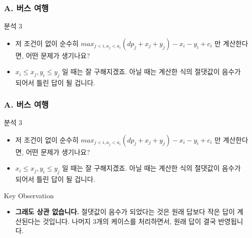 \documentclass{beamer}
\begin{document}
\begin{frame}
	\frametitle{A. 버스 여행}
	\begin{block}{분석 3}
		\begin{itemize}
			\item 저 조건이 없이 순수히 $max_{j < i, a_j < a_i} (dp_j + x_j + y_j) - x_i - y_i + c_i$ 만 계산한다면, 어떤 문제가 생기나요?
			\item $x_i \leq x_j, y_i \leq y_j$ 일 때는 잘 구해지겠죠. 아닐 때는 계산한 식의 절댓값이 음수가 되어서 틀린 답이 될 겁니다.
		\end{itemize}
	\end{block}
\end{frame}

\begin{frame}
	\frametitle{A. 버스 여행}
	\begin{block}{분석 3}
		\begin{itemize}
			\item 저 조건이 없이 순수히 $max_{j < i, a_j < a_i} (dp_j + x_j + y_j) - x_i - y_i + c_i$ 만 계산한다면, 어떤 문제가 생기나요?
			\item $x_i \leq x_j, y_i \leq y_j$ 일 때는 잘 구해지겠죠. 아닐 때는 계산한 식의 절댓값이 음수가 되어서 틀린 답이 될 겁니다.
		\end{itemize}
	\end{block}
	\begin{block}{Key Observation}
		\begin{itemize}
			\item \textbf{그래도 상관 없습니다.} 절댓값이 음수가 되었다는 것은 원래 답보다 작은 답이 계산된다는 것입니다. 나머지 3개의 케이스를 처리하면서, 원래 답이 결국 반영됩니다.
		\end{itemize}
	\end{block}
\end{frame}
\end{document}
